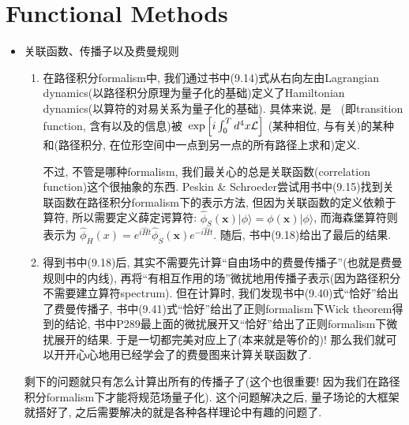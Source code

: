 \chapter{Functional Methods}

\begin{itemize}
  \item 关联函数、传播子以及费曼规则
        \begin{enumerate}
          \item 在路径积分formalism中, 我们通过书中(9.14)式从右向左由Lagrangian dynamics(以路径积分原理为量子化的基础)定义了Hamiltonian dynamics(以算符的对易关系为量子化的基础).
                具体来说, 是\ {} (即transition function, 含有以及的信息)被\ {\color{OliveGreen}$\exp{\Bigl[i\int_0^T d^4 x \mathcal{L}}\Bigr]$} (某种相位, 与有关)的{\color{OliveGreen}某种和}(路径积分, 在位形空间中一点到另一点的所有路径上求和)定义.

                  不过, 不管是哪种formalism, 我们最关心的总是关联函数(correlation function)这个很抽象的东西.
                  Peskin \& Schroeder尝试用书中(9.15)找到关联函数在路径积分formalism下的表示方法, 但因为关联函数的定义依赖于算符, 所以需要定义薛定谔算符: $\hat{\phi}_S(\mathbf{x})|\phi\rangle = \phi(\mathbf{x})|\phi\rangle$, 而海森堡算符则表示为 $\hat{\phi}_H(x) = e^{i\hat{H}t}\hat{\phi}_S(\mathbf{x}) e^{-i\hat{H}t}$.
                随后, 书中(9.18)给出了最后的结果.

          \item 得到书中(9.18)后, 其实不需要先计算“自由场中的费曼传播子”(也就是费曼规则中的内线), 再将“有相互作用的场”微扰地用传播子表示(因为路径积分不需要建立算符spectrum).
                但在计算时, 我们发现书中(9.40)式“恰好”给出了费曼传播子, 书中(9.41)式“恰好”给出了正则formalism下Wick theorem得到的结论, 书中P289最上面的微扰展开又“恰好”给出了正则formalism下微扰展开的结果.
                于是一切都完美对应上了(本来就是等价的)!
                那么我们就可以开开心心地用已经学会了的费曼图来计算关联函数了.
        \end{enumerate}

        剩下的问题就只有怎么计算出所有的传播子了(这个也很重要! 因为我们在路径积分formalism下才能将规范场量子化).
        这个问题解决之后, 量子场论的大框架就搭好了, 之后需要解决的就是各种各样理论中有趣的问题了.

        \clearpage


\end{itemize}
